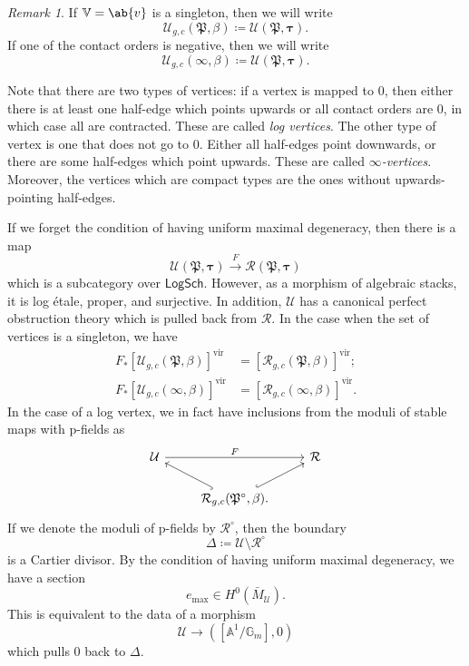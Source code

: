 \documentclass{amsart}
\theoremstyle{definition}
\theoremstyle{remark}
\newtheorem{rmk}[thm]{Remark}
\theoremstyle{plain}
\theoremstyle{definition}
\theoremstyle{remark}
\newcommand{\A}{\mathbb{A}}
\newcommand{\G}{\mathbb{G}}
\newcommand{\V}{\mathbb{V}}
\newcommand{\mc}[1]{\mathcal{#1}}
\newcommand{\mf}[1]{\mathfrak{#1}}
\newcommand{\mr}[1]{\mathrm{#1}}
\newcommand{\ms}[1]{\mathsf{#1}}
\newcommand{\1}{\mathbf{1}}
\newcommand{\2}{\mathbf{2}}
\newcommand{\3}{\mathbf{3}}
\newcommand{\vir}{\mr{vir}}
\begin{document}
\begin{rmk}
    If \(\V = \ab\{v\}\) is a singleton, then we will write
    \[ \mc{U}_{g, c}(\mf{P}, \beta) \coloneqq \mc{U}(\mf{P}, \bm{\tau}). \]
    If one of the contact orders is negative, then we will write
    \[ \mc{U}_{g, c}(\infty, \beta) \coloneqq \mc{U}(\mf{P}, \bm{\tau}). \]
\end{rmk}

Note that there are two types of vertices: if a vertex is mapped to \(0\), then either there is at least one half-edge which points upwards or all contact orders are \(0\), in which case all are contracted. These are called \textit{log vertices}. The other type of vertex is one that does not go to \(0\). Either all half-edges point downwards, or there are some half-edges which point upwards. These are called \textit{\(\infty\)-vertices}. Moreover, the vertices which are compact types are the ones without upwards-pointing half-edges.

If we forget the condition of having uniform maximal degeneracy, then there is a map
\[ \mc{U}(\mf{P}, \bm{\tau}) \xrightarrow{F} \mc{R}(\mf{P}, \bm{\tau}) \]
which is a subcategory over \(\ms{LogSch}\). However, as a morphism of algebraic stacks, it is log \'etale, proper, and surjective. In addition, \(\mc{U}\) has a canonical perfect obstruction theory which is pulled back from \(\mc{R}\). In the case when the set of vertices is a singleton, we have
\begin{align*}
    F_* [\mc{U}_{g, c}(\mf{P}, \beta)]^{\vir} &= [\mc{R}_{g, c}(\mf{P}, \beta)]^{\vir}; \\
    F_* [\mc{U}_{g, c}(\infty, \beta)]^{\vir} &= [\mc{R}_{g, c}(\infty, \beta)]^{\vir}.
\end{align*}
In the case of a log vertex, we in fact have inclusions from the moduli of stable maps with p-fields as
\begin{equation*}
\begin{tikzcd}
    \mc{U} \ar{rr}{F} & & \mc{R} \\
    & \mc{R}_{g,c}(\mf{P}^{\circ}, \beta) \ar[hookrightarrow]{ul} \ar[hookrightarrow]{ur}.
\end{tikzcd}
\end{equation*}
If we denote the moduli of p-fields by \(\mc{R}^{\circ}\), then the boundary
\[ \Delta \coloneqq \mc{U} \setminus \mc{R}^{\circ} \]
is a Cartier divisor. By the condition of having uniform maximal degeneracy, we have a section
\[ e_{\max} \in H^0(\bar{M}_{\mc{U}}). \]
This is equivalent to the data of a morphism
\[ \mc{U} \to ([\A^1/\G_m], 0) \]
which pulls \(0\) back to \(\Delta\).
\end{document}

